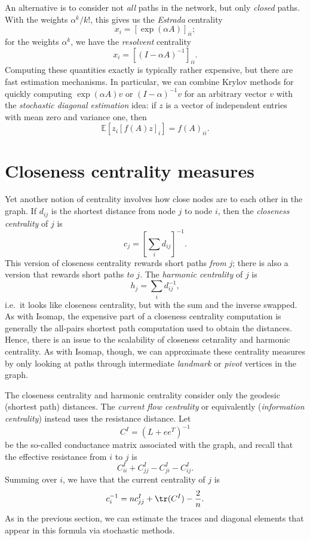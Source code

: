 \documentclass[12pt, leqno]{article} %
\begin{document}
An alternative is to consider not {\em all} paths in the network, but
only {\em closed} paths.  With the weights $\alpha^k / k!$, this gives
us the {\em Estrada} centrality
\[
  x_i = \left[ \exp(\alpha A) \right]_{ii};
\]
for the weights $\alpha^k$, we have the {\em resolvent} centrality
\[
  x_i = \left[ (I-\alpha A)^{-1} \right]_{ii}.
\]
Computing these quantities exactly is typically rather expensive, but
there are fast estimation mechanisms.  In particular, we can combine
Krylov methods for quickly computing $\exp(\alpha A) v$ or $(I-\alpha)^{-1} v$
for an arbitrary vector $v$ with the
{\em stochastic diagonal estimation} idea: if $z$ is a vector of independent
entries with mean zero and variance one, then
\[
  \mathbb{E}\left[ z_i [f(A) z]_i \right] = f(A)_{ii}.
\]

\section{Closeness centrality measures}


Yet another notion of centrality involves how close nodes are to each
other in the graph.  If $d_{ij}$ is the shortest distance from node
$j$ to node $i$, then the {\em closeness centrality} of $j$ is
\[
  c_j = \left[ \sum_i d_{ij} \right]^{-1}.
\]
This version of closeness centrality rewards short paths {\em from} $j$;
there is also a version that rewards short paths {\em to} $j$.  The
{\em harmonic centrality} of $j$ is
\[
  h_j = \sum_i d_{ij}^{-1},
\]
i.e.~it looks like closeness centrality, but with the sum and the
inverse swapped.  As with Isomap, the expensive part of a
closeness centrality computation is generally the all-pairs shortest
path computation used to obtain the distances.  Hence, there is an
issue to the scalability of closeness cetnrality and harmonic
centrality.  As with Isomap, though, we can approximate these
centrality measures by only looking at paths through
intermediate {\em landmark} or {\em pivot} vertices in the graph.

The closeness centrality and harmonic centrality consider only
the geodesic (shortest path) distances.  The
{\em current flow centrality} or equivalently ({\em information centrality})
instead uses the resistance distance.  Let
\[
  C^I = (L + ee^T)^{-1}
\]
be the so-called conductance matrix associated with the graph, and
recall that the effective resistance from $i$ to $j$ is
\[
  C^I_{ii} + C^I_{jj} - C^I_{ji} - C^I_{ij}.
\]
Summing over $i$, we have that the current centrality of $j$ is
\[
  c_i^{-1} = n c^I_{jj} + \tr(C^I) - \frac{2}{n}.
\]
As in the previous section, we can estimate the traces and diagonal
elements that appear in this formula via stochastic methods.
\end{document}

